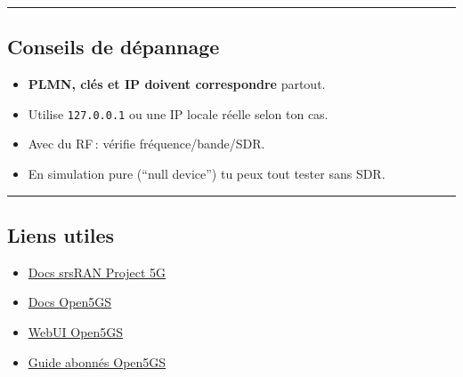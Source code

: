 \documentclass[
]{article}
\providecommand{\tightlist}{%
  \setlength{\itemsep}{0pt}\setlength{\parskip}{0pt}}
\begin{document}
\begin{center}\rule{0.5\linewidth}{0.5pt}\end{center}

\subsection{Conseils de dépannage}\label{conseils-de-duxe9pannage}

\begin{itemize}
\tightlist
\item
  \textbf{PLMN, clés et IP doivent correspondre} partout.
\item
  Utilise \texttt{127.0.0.1} ou une IP locale réelle selon ton cas.
\item
  Avec du RF\,: vérifie fréquence/bande/SDR.
\item
  En simulation pure (``null device'') tu peux tout tester sans SDR.
\end{itemize}

\begin{center}\rule{0.5\linewidth}{0.5pt}\end{center}

\subsection{Liens utiles}\label{liens-utiles-2}

\begin{itemize}
\tightlist
\item
  \href{https://docs.srsran.com/projects/5g/en/latest/}{Docs srsRAN
  Project 5G}
\item
  \href{https://open5gs.org/open5gs/docs/}{Docs Open5GS}
\item
  \href{https://github.com/open5gs/open5gs/wiki/WebUI}{WebUI Open5GS}
\item
  \href{https://open5gs.org/open5gs/docs/guide-subscription/}{Guide
  abonnés Open5GS}
\end{itemize}
\end{document}
